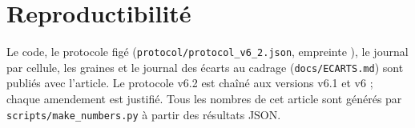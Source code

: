 \section*{Reproductibilité}
Le code, le protocole figé (\texttt{protocol/protocol\_v6\_2.json},
empreinte \ChiffreEmpreinte), le journal par cellule, les graines et le
journal des écarts au cadrage (\texttt{docs/ECARTS.md}) sont publiés avec
l'article. Le protocole v6.2 est chaîné aux versions v6.1 et v6 ; chaque amendement
est justifié. Tous les nombres de cet article sont générés
par \texttt{scripts/make\_numbers.py} à partir des résultats JSON.
